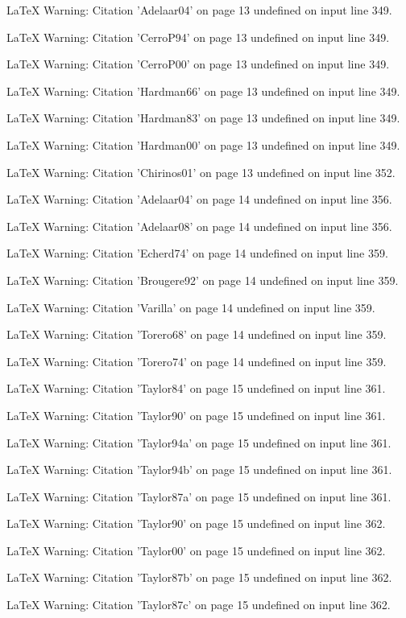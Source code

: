 LaTeX Warning: Citation 'Adelaar04' on page 13 undefined on input line 349.


LaTeX Warning: Citation 'CerroP94' on page 13 undefined on input line 349.


LaTeX Warning: Citation 'CerroP00' on page 13 undefined on input line 349.


LaTeX Warning: Citation 'Hardman66' on page 13 undefined on input line 349.


LaTeX Warning: Citation 'Hardman83' on page 13 undefined on input line 349.


LaTeX Warning: Citation 'Hardman00' on page 13 undefined on input line 349.


LaTeX Warning: Citation 'Chirinos01' on page 13 undefined on input line 352.


LaTeX Warning: Citation 'Adelaar04' on page 14 undefined on input line 356.


LaTeX Warning: Citation 'Adelaar08' on page 14 undefined on input line 356.


LaTeX Warning: Citation 'Echerd74' on page 14 undefined on input line 359.


LaTeX Warning: Citation 'Brougere92' on page 14 undefined on input line 359.


LaTeX Warning: Citation 'Varilla' on page 14 undefined on input line 359.


LaTeX Warning: Citation 'Torero68' on page 14 undefined on input line 359.


LaTeX Warning: Citation 'Torero74' on page 14 undefined on input line 359.


LaTeX Warning: Citation 'Taylor84' on page 15 undefined on input line 361.


LaTeX Warning: Citation 'Taylor90' on page 15 undefined on input line 361.


LaTeX Warning: Citation 'Taylor94a' on page 15 undefined on input line 361.


LaTeX Warning: Citation 'Taylor94b' on page 15 undefined on input line 361.


LaTeX Warning: Citation 'Taylor87a' on page 15 undefined on input line 361.


LaTeX Warning: Citation 'Taylor90' on page 15 undefined on input line 362.


LaTeX Warning: Citation 'Taylor00' on page 15 undefined on input line 362.


LaTeX Warning: Citation 'Taylor87b' on page 15 undefined on input line 362.


LaTeX Warning: Citation 'Taylor87c' on page 15 undefined on input line 362.


